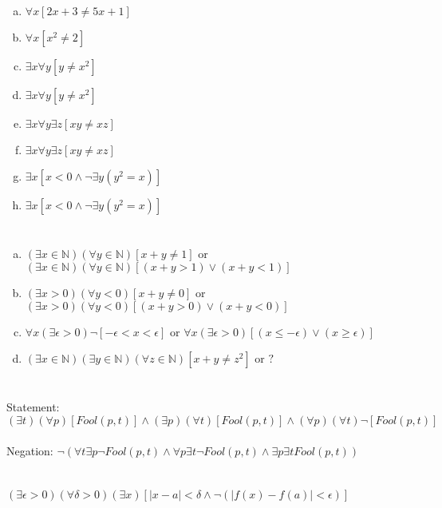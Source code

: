 \documentclass{article}
\begin{document}
\section{}

\begin{enumerate}[(a)]
\item $\forall x [2x + 3 \neq 5x + 1]$
\item $\forall x [x^2 \neq 2]$
\item $\exists x \forall y [y \neq x^2]$
\item $\exists x \forall y [y \neq x^2]$
\item $\exists x \forall y \exists z [xy \neq xz]$
\item $\exists x \forall y \exists z [xy \neq xz]$
\item $\exists x [x < 0 \wedge \neg \exists y (y^2 = x)]$
\item $\exists x [x < 0 \wedge \neg \exists y (y^2 = x)]$
\end{enumerate}

\section{}

\begin{enumerate}[(a)]
\item $(\exists x \in \mathbb{N})(\forall y \in \mathbb{N})[x + y \neq 1]$ or $(\exists x \in \mathbb{N})(\forall y \in \mathbb{N})[(x + y > 1) \vee (x + y  < 1)]$
\item $(\exists x > 0)(\forall y < 0)[x + y \neq 0]$ or $(\exists x > 0)(\forall y < 0)[(x + y > 0) \vee (x + y < 0)]$
\item $\forall x(\exists \epsilon> 0)\neg[-\epsilon < x < \epsilon]$ or $\forall x(\exists \epsilon> 0)[(x \leq -\epsilon) \vee (x \geq \epsilon)]$
\item $(\exists x \in \mathbb{N})(\exists y \in \mathbb{N})(\forall z \in \mathbb{N})[x + y \neq z^2]$ or $?$
\end{enumerate}

\section{}

Statement: $(\exists t)(\forall p)[Fool(p, t)] \wedge (\exists p)(\forall t)[Fool(p, t)] \wedge (\forall p)(\forall t)\neg[Fool(p, t)]$
\\\\
Negation: $\neg(\forall t \exists p \neg Fool(p, t) \wedge \forall p \exists t \neg Fool(p, t) \wedge \exists p \exists t Fool(p, t))$

\section{}

$(\exists \epsilon > 0)(\forall \delta > 0)(\exists x)[|x - a| < \delta \wedge \neg(|f(x) - f(a)| < \epsilon)]$
\end{document}
